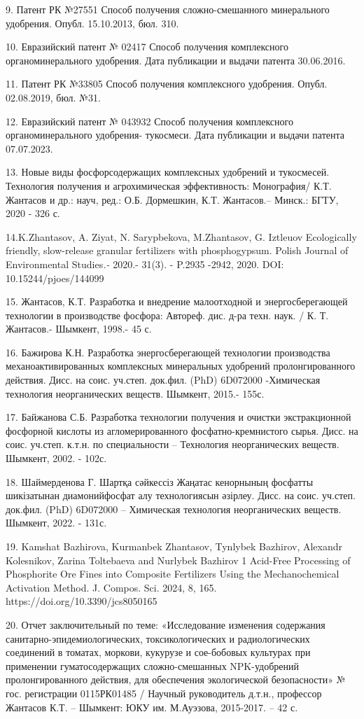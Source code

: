 \begin{noparindent}
9. Патент РК №27551 Способ получения сложно-смешанного минерального
удобрения. Опубл. 15.10.2013, бюл. 310.

10. Евразийский патент № 02417 Способ получения комплексного
органоминерального удобрения. Дата публикации и выдачи патента
30.06.2016.

11. Патент РК №33805 Способ получения комплексного удобрения. Опубл.
02.08.2019, бюл. №31.

12. Евразийский патент № 043932 Способ получения комплексного
органоминерального удобрения- тукосмеси. Дата публикации и выдачи патента
07.07.2023.

13. Новые виды фосфорсодержащих комплексных удобрений и тукосмесей.
Технология получения и агрохимическая эффективность: Монография/ К.Т.
Жантасов и др.: науч, ред.: О.Б. Дормешкин, К.Т. Жантасов.-- Минск.:
БГТУ, 2020 - 326 с.

14.K.Zhantasov, A. Ziyat, N. Sarypbekova, M.Zhantasov, G. Iztleuov
Ecologically friendly, slow-release granular fertilizers with
phosphogypsum. Polish Journal of Environmental Studies\emph{.-} 2020.-
31(3). - P.2935 -2942, 2020. DOI: 10.15244/pjoes/144099

15. Жантасов, К.Т. Разработка и внедрение малоотходной и
энергосберегающей технологии в производстве фосфора: Автореф. дис. д-ра
техн. наук. / К. Т. Жантасов.- Шымкент, 1998.- 45 с.

16. Бажирова К.Н. Разработка энергосберегающей технологии производства
механоактивированных комплексных минеральных удобрений пролонгированного
действия. Дисс. на соис. уч.степ. док.фил. (PhD) 6D072000 -Химическая
технология неорганических веществ. Шымкент, 2015.- 155с.

17. Байжанова С.Б. Разработка технологии получения и очистки
экстракционной фосфорной кислоты из агломерированного
фосфатно-кремнистого сырья. Дисс. на соис. уч.степ. к.т.н. по
специальности -- Технология неорганических веществ. Шымкент, 2002. -
102с.

18. Шаймерденова Г. Шартқа сәйкессіз Жаңатас кенорнының фосфатты
шикізатынан диамонийфосфат алу технологиясын әзірлеу. Дисс. на соис.
уч.степ. док.фил. (PhD) 6D072000 -- Химическая технология неорганических
веществ. Шымкент, 2022. - 131с.

19. Kamshat Bazhirova, Kurmanbek Zhantasov, Tynlybek Bazhirov, Alexandr
Kolesnikov, Zarina Toltebaeva and Nurlybek Bazhirov 1 Acid-Free
Processing of Phosphorite Ore Fines into Composite Fertilizers Using the
Mechanochemical Activation Method. J. Compos. Sci. 2024, 8, 165.
https://doi.org/10.3390/jcs8050165

20. Отчет заключительный по теме: «Исследование изменения содержания
санитарно-эпидемиологических, токсикологических и радиологических
соединений в томатах, моркови, кукурузе и сое-бобовых культурах при
применении гуматосодержащих сложно-смешанных NPK-удобрений
пролонгированного действия, для обеспечения экологической безопасности»
№ гос. регистрации 0115РК01485 / Научный руководитель д.т.н., профессор
Жантасов К.Т. -- Шымкент: ЮКУ им. М.Ауэзова, 2015-2017. -- 42 с.
\end{noparindent}

